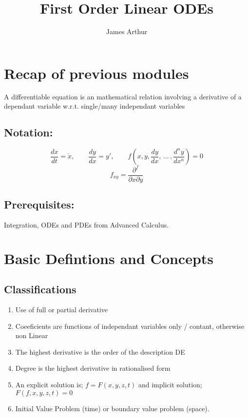 \documentclass{article}
\title{First Order Linear ODEs}
\author{James Arthur}
\newcommand{\di}{\frac{dy}{dx}}
\newcommand{\din}{\frac{d^ny}{dx^n}}
\newcommand{\dt}{\frac{dx}{dt}}
\begin{document}
\maketitle
\tableofcontents\newpage



\section{Recap of previous modules}
A differentiable equation is an mathematical relation involving a derivative of a dependant variable w.r.t. single/many independant variables\\

\subsection{Notation:}
$$ \dt = \dot{x},\qquad \di = y',\qquad f\left( x, y, \di,\, \dots \,, \din \right) = 0$$ $$ f_{xy} = \frac{\partial^f }{\partial x \partial y} $$

\subsection{Prerequisites: } Integration, ODEs and PDEs from Advanced Calculus.

\section{Basic Defintions and Concepts}

\subsection{Classifications}
\begin{enumerate}
  \item Use of full or partial derivative
  \item Coeeficients are functions of independant variables only / contant, otherwise non Linear
  \item The highest derivative is the order of the description DE
  \item Degree is the highest derivative in rationalised form
  \item An explicit solution is; $f = F(x, y, z, t) $ and implicit solution; $F(f, x, y, z, t) = 0$
  \item Initial Value Problem (time) or boundary value problem (space).
\end{enumerate}
\end{document}
